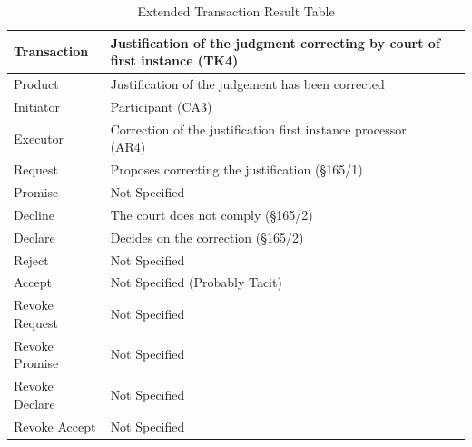 \begin{landscape}
\begin{table}[h]
\caption{Extended Transaction Result Table}
\label{tab:etrt}
\begin{tabular}{|l||l|l|}
\hline
Transaction  &  Justification of the judgment correcting by court of first instance (TK4) \\ \hline
Product      & Justification of the judgement has been corrected \\ \hline
Initiator      &  Participant (CA3) \\ \hline
Executor       &  Correction of the justification first instance processor  (AR4)      \\ \hline
Request        &  Proposes correcting the justification (\S165/1)   \\ \hline
Promise        &  Not Specified  \\ \hline
Decline        &  The court does not comply (\S165/2)  \\ \hline
Declare        &  Decides on the correction (\S165/2) \\ \hline
Reject         &  Not Specified   \\ \hline
Accept         &  Not Specified (Probably Tacit) \\ \hline
Revoke Request &  Not Specified        \\ \hline
Revoke Promise & Not Specified     \\ \hline
Revoke Declare & Not Specified       \\ \hline
Revoke Accept  &  Not Specified     \\ \hline
\end{tabular}
\end{table}


\end{landscape}
